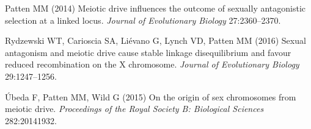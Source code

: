 \begin{thebibliography}{20}
Patten MM
 (2014) {Meiotic drive influences the outcome of sexually antagonistic
  selection at a linked locus}.
 \textit{Journal of Evolutionary Biology} 27:2360--2370.

Rydzewski WT, Carioscia SA, Li{\'e}vano G, Lynch VD, Patten MM
 (2016) {Sexual antagonism and meiotic drive cause stable linkage
  disequilibrium and favour reduced recombination on the X chromosome}.
 \textit{Journal of Evolutionary Biology} 29:1247--1256.

{\'U}beda F, Patten MM, Wild G
 (2015) {On the origin of sex chromosomes from meiotic drive.}
 \textit{Proceedings of the Royal Society B: Biological Sciences}
  282:20141932.

\end{thebibliography}
